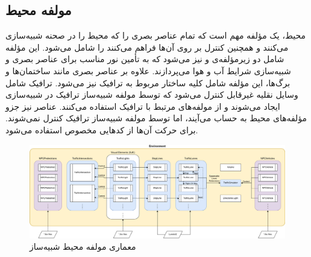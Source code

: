 \subsection{مولفه محیط}
محیط، یک مؤلفه مهم است که تمام عناصر بصری را که محیط را در صحنه شبیه‌سازی می‌کنند و همچنین کنترل بر روی آن‌ها فراهم می‌کنند را شامل می‌شود. این مؤلفه شامل دو زیر‌مؤلفه‌ی  و  نیز می‌شود که به تأمین نور مناسب برای عناصر بصری و شبیه‌سازی شرایط آب و هوا می‌پردازند.
علاوه بر عناصر بصری مانند ساختمان‌ها و برگ‌ها، این مؤلفه شامل کلیه ساختار مربوط به ترافیک نیز می‌شود. ترافیک شامل وسایل نقلیه غیرقابل کنترل  می‌شود که توسط مولفه شبیه‌ساز ترافیک  در شبیه‌سازی ایجاد می‌شوند و از مولفه‌های مرتبط با ترافیک استفاده می‌کنند.
عناصر  نیز جزو مؤلفه‌های محیط به حساب می‌آیند، اما توسط مولفه شبیه‌ساز ترافیک کنترل نمی‌شوند. برای حرکت آن‌ها از کد‌هایی مخصوص استفاده می‌شود.
\begin{figure}[h!]
    \centering
    \includegraphics[width=1\linewidth]{figures/AWSIM_Environment_Architecture.png}
    \caption{معماری مولفه محیط شبیه‌ساز  \cite{AWSIM:Documentation}}
    \label{fig:AWSIM_Environment_Architecture}
\end{figure}

